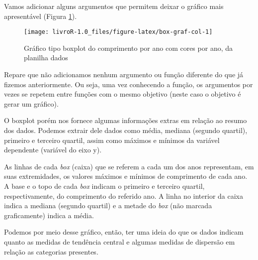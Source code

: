 \documentclass[14pt,titlepage, oneside, openany, a4paper]{book}
\newenvironment{Shaded}{\begin{snugshade}}{\end{snugshade}}
\newcommand{\DataTypeTok}[1]{\textcolor[rgb]{0.13,0.29,0.53}{#1}}
\newcommand{\KeywordTok}[1]{\textcolor[rgb]{0.13,0.29,0.53}{\textbf{#1}}}
\newcommand{\NormalTok}[1]{#1}
\newcommand{\OperatorTok}[1]{\textcolor[rgb]{0.81,0.36,0.00}{\textbf{#1}}}
\newcommand{\StringTok}[1]{\textcolor[rgb]{0.31,0.60,0.02}{#1}}
\begin{document}
Vamos adicionar alguns argumentos que permitem deixar o gráfico mais apresentável (Figura \ref{fig:box-graf-col}).

\begin{Shaded}
\end{Shaded}

\begin{figure}[H]

{\centering \texttt{[image: livroR-1.0\_files/figure-latex/box-graf-col-1]} 

}

\caption{Gráfico tipo boxplot do comprimento por ano com cores por ano, da planilha dados}\label{fig:box-graf-col}
\end{figure}

Repare que não adicionamos nenhum argumento ou função diferente do que já fizemos anteriormente. Ou seja, uma vez conhecendo a função, os argumentos por vezes se repetem entre funções com o mesmo objetivo (neste caso o objetivo é gerar um gráfico).

O boxplot porém nos fornece algumas informações extras em relação ao resumo dos dados. Podemos extrair dele dados como média, mediana (segundo quartil), primeiro e terceiro quartil, assim como máximos e mínimos da variável dependente (variável do eixo y).

As linhas de cada \emph{box} (caixa) que se referem a cada um dos anos representam, em suas extremidades, os valores máximos e mínimos de comprimento de cada ano. A base e o topo de cada \emph{box} indicam o primeiro e terceiro quartil, respectivamente, do comprimento do referido ano. A linha no interior da caixa indica a mediana (segundo quartil) e a metade do \emph{box} (não marcada graficamente) indica a média.

Podemos por meio desse gráfico, então, ter uma ideia do que os dados indicam quanto as medidas de tendência central e algumas medidas de dispersão em relação as categorias presentes.
\end{document}

